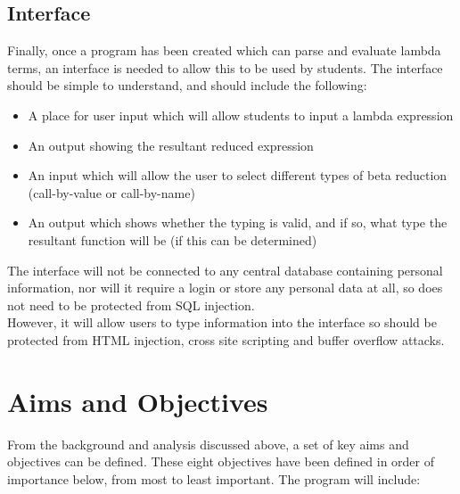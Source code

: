 \documentclass[a4paper,12pt]{report}
\begin{document}
\section{Interface}

Finally, once a program has been created which can parse and evaluate lambda terms, an interface is needed to allow this to be used by students. The interface should be simple to understand, and should include the following:

\begin{itemize}
	\item A place for user input which will allow students to input a lambda expression
	\item An output showing the resultant reduced expression
	\item An input which will allow the user to select different types of beta reduction (call-by-value or call-by-name)
	\item An output which shows whether the typing is valid, and if so, what type the resultant function will be (if this can be determined)
\end{itemize}

The interface will not be connected to any central database containing personal information, nor will it require a login or store any personal data at all, so does not need to be protected from SQL injection.\\

However, it will allow users to type information into the interface so should be protected from HTML injection, cross site scripting and buffer overflow attacks.

\chapter{Aims and Objectives}

From the background and analysis discussed above, a set of key aims and objectives can be defined. These eight objectives have been defined in order of importance below, from most to least important.
The program will include:
\end{document}
